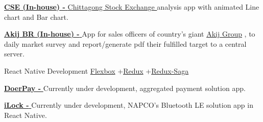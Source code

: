 \begin{projectentries}
{\begin{projectitems}
        \item {{\href{https://drive.google.com/file/d/1AE3tdaTBA1hnKjhM2Quv4poWi6oQthwy/view?usp=sharing}{\textbf{CSE (In-house) - }}}
        {\href{https://www.cse.com.bd/}{Chittagong Stock Exchange }}
        analysis app with animated Line chart and Bar chart.}  
        \item {{\href{https://www.akij.net/}{\textbf{Akij BR (In-house) - }}}
        App for sales officers of country's giant 
        {\href{https://www.akij.net}{Akij Group}}
        , to daily market survey and report/generate pdf their fulfilled target to a central server.}  
      \end{projectitems}
    }
    

    \projectentry 
    {React Native Development} 
    {{\href{https://css-tricks.com/snippets/css/a-guide-to-flexbox/}{Flexbox}}
    +{\href{https://redux.js.org/basics/usagewithreact}{Redux}}
    +{\href{https://redux.js.org/basics/usagewithreact}{Redux-Saga}}}
    {
      \begin{projectitems} %
        \item {{\href{http://doer.com.bd}{\textbf{DoerPay - }}}
        Currently under development, aggregated payment solution app.}
        \item {{\href{http://www.alarmlock.com/news/architech-bluetooth/}{\textbf{iLock - }}}
        Currently under development, NAPCO's Bluetooth LE solution app in React Native.}  
      \end{projectitems}
    }
\end{projectentries}
